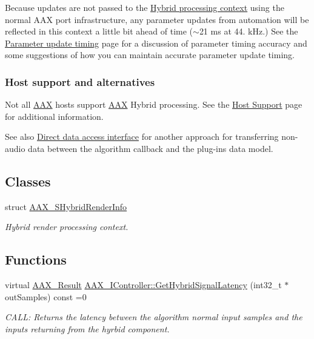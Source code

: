 Because updates are not passed to the \hyperlink{a00121}{Hybrid processing context} using the normal A\+A\+X port infrastructure, any parameter updates from automation will be reflected in this context a little bit ahead of time ($\sim$21 ms at 44. k\+Hz.) See the \hyperlink{a00351}{Parameter update timing} page for a discussion of parameter timing accuracy and some suggestions of how you can maintain accurate parameter update timing.\hypertarget{a00335_additionalFeatures_Hybrid_hostsupport}{}\subsubsection{Host support and alternatives}\label{a00335_additionalFeatures_Hybrid_hostsupport}
Not all \hyperlink{a00288}{A\+A\+X} hosts support \hyperlink{a00288}{A\+A\+X} Hybrid processing. See the \hyperlink{a00373}{Host Support} page for additional information.

\begin{DoxySeeAlso}{See also}
\hyperlink{a00333}{Direct data access interface} for another approach for transferring non-\/audio data between the algorithm callback and the plug-\/in\textquotesingle{}s data model. 
\end{DoxySeeAlso}
\subsection*{Classes}
\begin{DoxyCompactItemize}
\item 
struct \hyperlink{a00121}{A\+A\+X\+\_\+\+S\+Hybrid\+Render\+Info}
\begin{DoxyCompactList}\small\item\em Hybrid render processing context. \end{DoxyCompactList}\end{DoxyCompactItemize}
\subsection*{Functions}
\begin{DoxyCompactItemize}
\item 
virtual \hyperlink{a00149_a4d8f69a697df7f70c3a8e9b8ee130d2f}{A\+A\+X\+\_\+\+Result} \hyperlink{a00335_ga47b471c438fcad0798964b860d74609e}{A\+A\+X\+\_\+\+I\+Controller\+::\+Get\+Hybrid\+Signal\+Latency} (int32\+\_\+t $\ast$out\+Samples) const =0
\begin{DoxyCompactList}\small\item\em C\+A\+L\+L\+: Returns the latency between the algorithm normal input samples and the inputs returning from the hyrbid component. \end{DoxyCompactList}\end{DoxyCompactItemize}
